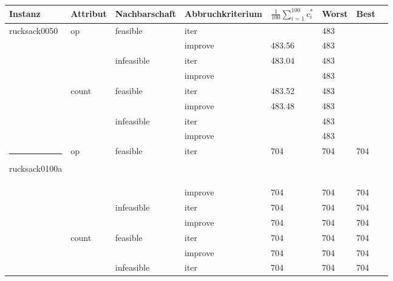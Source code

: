 \documentclass[11pt,a4paper]{article}
\makeatletter
\def\hlinewd#1{
  \noalign{\ifnum0=`}\fi\hrule \@height #1 \futurelet
  \reserved@a\@xhline
}
\makeatother
\begin{document}
\clearpage

\begin{table}[!t]
  \centering
  \begin{tabular}{ | l | l | l | l | l | l | l | l | }
    \hline
        \textbf{Instanz} & \textbf{Attribut} & \textbf{Nachbarschaft} & \textbf{Abbruchkriterium} & \textbf{\(\frac{1}{100}\displaystyle\sum_{i=1}^{100} c_i^*\)} & \textbf{Worst} & \textbf{Best} \\ \hline
        rucksack0050  & op    & feasible   & iter    & \color{OliveGreen}{483.76}  & 483 & \color{OliveGreen}{487} \\ \hline
                      &       &            & improve & 483.56 & 483 & \color{OliveGreen}{487} \\ \hline
                      &       & infeasible & iter    & 483.04 & 483 & \color{OliveGreen}{487} \\ \hline
                      &       &            & improve & \color{BrickRed}{483} & 483 & \color{BrickRed}{483} \\ \hline
                      & count & feasible   & iter    & 483.52 & 483 & \color{OliveGreen}{487} \\ \hline
                      &       &            & improve & 483.48 & 483 & \color{OliveGreen}{487} \\ \hline
                      &       & infeasible & iter    & \color{BrickRed}{483} & 483 & \color{BrickRed}{483} \\ \hline
                      &       &            & improve & \color{BrickRed}{483} & 483 & \color{BrickRed}{483} \\ \hlinewd{3pt}
        rucksack0100a & op    & feasible   & iter    & 704  & 704 & 704 \\ \hline
                      &       &            & improve & 704  & 704 & 704  \\ \hline
                      &       & infeasible & iter    & 704  & 704 & 704  \\ \hline
                      &       &            & improve & 704  & 704 & 704 \\ \hline
                      & count & feasible   & iter    & 704  & 704 & 704 \\ \hline
                      &       &            & improve & 704  & 704 & 704 \\ \hline
                      &       & infeasible & iter    & 704  & 704 & 704 \\ \hline

\end{tabular}
\end{table}
\end{document}
